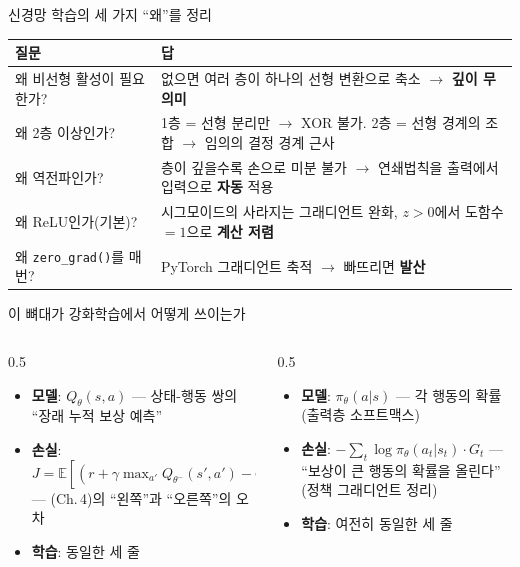 \documentclass[aspectratio=169,11pt]{beamer}
\begin{document}
\begin{frame}{신경망 학습의 세 가지 ``왜''를 정리}
  \small
  \begin{tabular}{@{}p{}p{}@{}}
    \toprule
    질문 & 답 \\
    \midrule
    왜 비선형 활성이 필요한가? & 없으면 여러 층이 하나의 선형 변환으로
      축소 $\to$ \textbf{깊이 무의미} \\
    왜 2층 이상인가? & 1층 = 선형 분리만 $\to$ XOR 불가.
      2층 = 선형 경계의 조합 $\to$ 임의의 결정 경계 근사 \\
    왜 역전파인가? & 층이 깊을수록 손으로 미분 불가 $\to$
      연쇄법칙을 출력에서 입력으로 \textbf{자동} 적용 \\
    왜 ReLU인가(기본)? & 시그모이드의 사라지는 그래디언트 완화,
      $z>0$에서 도함수 $= 1$으로 \textbf{계산 저렴} \\
    왜 \texttt{zero\_grad()}를 매번? & PyTorch 그래디언트 축적
      $\to$ 빠뜨리면 \textbf{발산} \\
    \bottomrule
  \end{tabular}
\end{frame}

\begin{frame}{이 뼈대가 강화학습에서 어떻게 쓰이는가}
  \begin{columns}[T]
    \begin{column}{0.5\textwidth}
      \begin{itemize}
        \item \textbf{모델}: $Q_\theta(s, a)$ --- 상태-행동 쌍의
          ``장래 누적 보상 예측''
        \item \textbf{손실}:
          $J = \mathbb{E}\left[(r + \gamma \max_{a'} Q_{\theta^-}(s', a')
          - Q_\theta(s, a))^2\right]$ ---
          (Ch.\,4)의 ``왼쪽''과 ``오른쪽''의 오차
        \item \textbf{학습}: 동일한 세 줄
      \end{itemize}
    \end{column}
    \begin{column}{0.5\textwidth}
      \begin{itemize}
        \item \textbf{모델}: $\pi_\theta(a|s)$ --- 각 행동의 확률
          (출력층 소프트맥스)
        \item \textbf{손실}:
          $-\sum_t \log \pi_\theta(a_t|s_t)\cdot G_t$ ---
          ``보상이 큰 행동의 확률을 올린다'' (정책 그래디언트 정리)
        \item \textbf{학습}: 여전히 동일한 세 줄
      \end{itemize}
    \end{column}
  \end{columns}
\end{frame}
\end{document}
